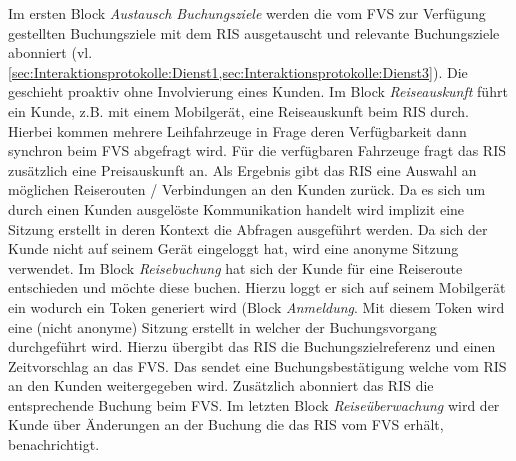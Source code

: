 Im ersten Block \textit{Austausch Buchungsziele} werden die vom FVS zur Verfügung gestellten Buchungsziele mit dem RIS ausgetauscht und relevante Buchungsziele abonniert (vl. \cref{sec:Interaktionsprotokolle:Dienst1,sec:Interaktionsprotokolle:Dienst3}). Die geschieht proaktiv ohne Involvierung eines Kunden. 
Im Block \textit{Reiseauskunft} führt ein Kunde, z.B. mit einem Mobilgerät, eine Reiseauskunft beim RIS durch. Hierbei kommen mehrere Leihfahrzeuge in Frage deren Verfügbarkeit dann synchron beim FVS abgefragt wird. Für die verfügbaren Fahrzeuge fragt das RIS zusätzlich eine Preisauskunft an. Als Ergebnis gibt das RIS eine Auswahl an möglichen Reiserouten / Verbindungen an den Kunden zurück. Da es sich um durch einen Kunden ausgelöste Kommunikation handelt wird implizit eine Sitzung erstellt in deren Kontext die Abfragen ausgeführt werden. Da sich der Kunde nicht auf seinem Gerät eingeloggt hat, wird eine anonyme Sitzung verwendet.
Im Block \textit{Reisebuchung} hat sich der Kunde für eine Reiseroute entschieden und möchte diese buchen. Hierzu loggt er sich auf seinem Mobilgerät ein wodurch ein Token generiert wird (Block \emph{Anmeldung}. Mit diesem Token wird eine (nicht anonyme) Sitzung erstellt in welcher der Buchungsvorgang durchgeführt wird. Hierzu übergibt das RIS die Buchungszielreferenz und einen Zeitvorschlag an das FVS. Das sendet eine Buchungsbestätigung welche vom RIS an den Kunden weitergegeben wird. Zusätzlich abonniert das RIS die entsprechende Buchung beim FVS.
Im letzten Block \textit{Reiseüberwachung} wird der Kunde über Änderungen an der Buchung die das RIS vom FVS erhält, benachrichtigt.

